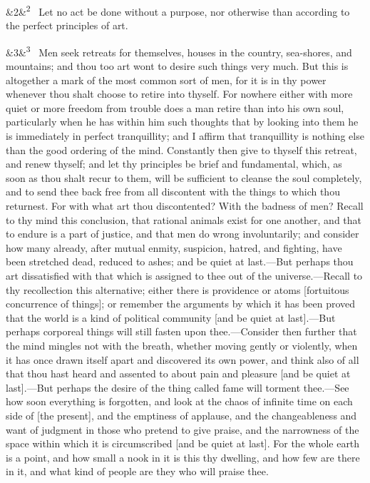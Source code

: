 \documentclass[12pt]{article}
\newcommand{\para}[1][]{\par\noindent\ifx&#1&\else\textsuperscript{\footnotesize #1}~\fi}
\begin{document}
\para[2] Let no act be done without a purpose, nor otherwise than according to
the perfect principles of art.

\para[3] Men seek retreats for themselves, houses in the country, sea-shores,
and mountains; and thou too art wont to desire such things very much.
But this is altogether a mark of the most common sort of men, for it is
in thy power whenever thou shalt choose to retire into thyself. For
nowhere either with more quiet or more freedom from trouble does a man
retire than into his own soul, particularly when he has within him such
thoughts that by looking into them he is immediately in perfect
tranquillity; and I affirm that tranquillity is nothing else than the
good ordering of the mind. Constantly then give to thyself this retreat,
and renew thyself; and let thy principles be brief and fundamental,
which, as soon as thou shalt recur to them, will be sufficient to
cleanse the soul completely, and to send thee back free from all
discontent with the things to which thou returnest. For with what art
thou discontented? With the badness of men? Recall to thy mind this
conclusion, that rational animals exist for one another, and that to
endure is a part of justice, and that men do wrong involuntarily; and
consider how many already, after mutual enmity, suspicion, hatred, and
fighting, have been stretched dead, reduced to ashes; and be quiet at
last.---But perhaps thou art dissatisfied with that which is assigned to
thee out of the universe.---Recall to thy recollection this alternative;
either there is providence or atoms [fortuitous concurrence of things];
or remember the arguments by which it has been proved that the world is
a kind of political community [and be quiet at last].---But perhaps
corporeal things will still fasten upon thee.---Consider then further
that the mind mingles not with the breath, whether moving gently or
violently, when it has once drawn itself apart and discovered its own
power, and think also of all that thou hast heard and assented to about
pain and pleasure [and be quiet at last].---But perhaps the desire of the
thing called fame will torment thee.---See how soon everything is
forgotten, and look at the chaos of infinite time on each side of [the
present], and the emptiness of applause, and the changeableness and want
of judgment in those who pretend to give praise, and the narrowness of
the space within which it is circumscribed [and be quiet at last]. For
the whole earth is a point, and how small a nook in it is this thy
dwelling, and how few are there in it, and what kind of people are they
who will praise thee.
\end{document}
